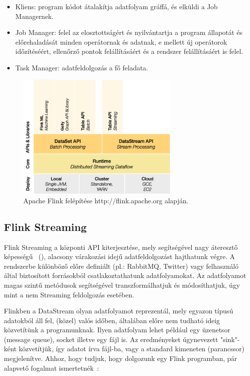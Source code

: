 \documentclass[a4paper,12pt]{article}
\begin{document}
\begin{itemize}
\item Kliens: program kódot átalakítja adatfolyam gráffá, és elküldi a Job Managernek.
\item Job Manager: felel az elosztottságért és nyilvántartja a program állapotát és előrehaladását minden operátornak és adatnak, e mellett új operátorok időzítéséért, ellenőrző pontok felállításáért és a rendszer felállításáért is felel.
\item Task Manager: adatfeldolgozás a fő feladata.
\end{itemize}

\begin{figure}[H]
\centering
\includegraphics[width=80mm]{img/flink.png}
\caption{Apache Flink felépítése http://flink.apache.org alapján. \label{apache_flink}}
\end{figure}

\subsection{Flink Streaming}

Flink Streaming a központi API kiterjesztése, mely segítségével nagy áteresztő képességű ~(\cite{flink_gyula}), alacsony várakozási idejű adatfeldolgozást hajthatunk végre. A rendszerbe különböző előre definiált (pl.: RabbitMQ, Twitter) vagy felhasználó által biztosított forrásokból csatlakoztathatunk adatfolyamokat. Az adatfolyamot magas szintű metódusok segítségével transzformálhatjuk és módosíthatjuk, úgy mint a nem Streaming feldolgozás esetében.  

Flinkben a DataStream olyan adatfolyamot reprezentál, mely egyazon típusú adatokból áll fel, (közel) valós időben, általában előre nem tudható ideig közvetítünk a programunknak. Ilyen adatfolyam lehet például egy üzenetsor (message queue), socket illetve egy fájl is. Az eredményeket úgynevezett "sink"-ként közvetítjük, így adatot írva fájl-ba, vagy a standard kimeneten (parancssor) megjelenítve. Ahhoz, hogy tudjuk, hogy dolgozunk egy Flink programban, pár alapvető fogalmat ismertetnék~\cite{datastreamapi}:
\end{document}
